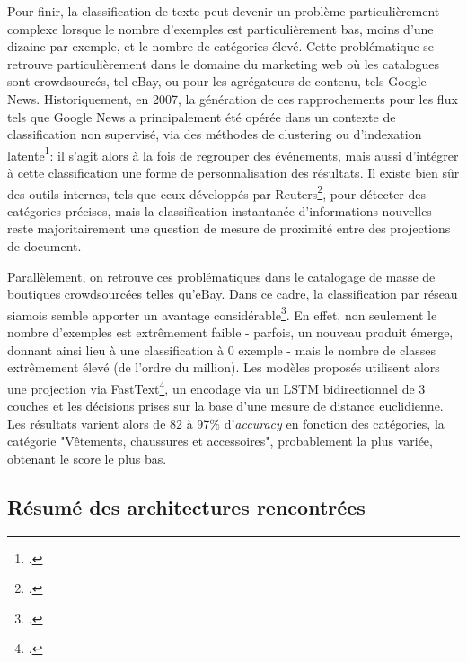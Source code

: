 Pour finir, la classification de texte peut devenir un problème particulièrement complexe lorsque le nombre d'exemples est particulièrement bas, moins d'une dizaine par exemple, et le nombre de catégories élevé. Cette problématique se retrouve particulièrement dans le domaine du marketing web où les catalogues sont crowdsourcés, tel eBay, ou pour les agrégateurs de contenu, tels Google News. Historiquement, en 2007, la génération de ces rapprochements pour les flux tels que Google News a principalement été opérée dans un contexte de classification non supervisé, via des méthodes de clustering ou d'indexation latente\footcite{das_google_2007}: il s'agit alors à la fois de regrouper des événements, mais aussi d'intégrer à cette classification une forme de personnalisation des résultats. Il existe bien sûr des outils internes, tels que ceux développés par Reuters\footcite{nugent_comparison_2017}, pour détecter des catégories précises, mais la classification instantanée d'informations nouvelles reste majoritairement une question de mesure de proximité entre des projections de document. 

Parallèlement, on retrouve ces problématiques dans le catalogage de masse de boutiques crowdsourcées telles qu'eBay. Dans ce cadre, la classification par réseau siamois semble apporter un avantage considérable\footcite{shah_neural_2018}. En effet, non seulement le nombre d'exemples est extrêmement faible  - parfois, un nouveau produit émerge, donnant ainsi lieu à une classification à 0 exemple - mais le nombre de classes extrêmement élevé (de l'ordre du million). Les modèles proposés utilisent alors une projection via FastText\footcite{fasttext}, un encodage via un LSTM bidirectionnel de 3 couches et les décisions prises sur la base d'une mesure de distance euclidienne. Les résultats varient alors de 82 à 97\% d'\textit{accuracy} en fonction des catégories, la catégorie "Vêtements, chaussures et accessoires", probablement la plus variée, obtenant le score le plus bas.

\subsection{Résumé des architectures rencontrées}

